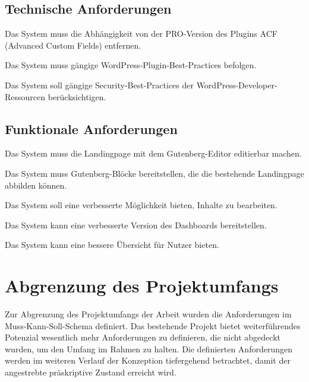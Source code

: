\subsection{Technische Anforderungen}
\begin{enumerate}[label={[T\arabic*]},ref=T\arabic*]
    \item \label{T1} Das System muss die Abhängigkeit von der PRO-Version des Plugins ACF (Advanced Custom Fields) entfernen.
    \item \label{T2} Das System muss gängige WordPress-Plugin-Best-Practices befolgen.
    \item \label{T3} Das System soll gängige Security-Best-Practices der WordPress-Developer-Ressourcen berücksichtigen.
\end{enumerate}

\subsection{Funktionale Anforderungen}
\begin{enumerate}[label={[F\arabic*]},ref=F\arabic*]
    \item \label{F1} Das System muss die Landingpage mit dem Gutenberg-Editor editierbar machen.
    \item \label{F2} Das System muss Gutenberg-Blöcke bereitstellen, die die bestehende Landingpage abbilden können.
    \item \label{F3} Das System soll eine verbesserte Möglichkeit bieten, Inhalte zu bearbeiten.
    \item \label{F4} Das System kann eine verbesserte Version des Dashboards bereitstellen.
    \item \label{F5} Das System kann eine bessere Übersicht für Nutzer bieten.
\end{enumerate}

\section{Abgrenzung des Projektumfangs}
Zur Abgrenzung des Projektumfangs der Arbeit wurden die Anforderungen im Muss-Kann-Soll-Schema definiert.
Das bestehende Projekt bietet weiterführendes Potenzial wesentlich mehr Anforderungen zu definieren, die nicht abgedeckt wurden, um den Umfang im Rahmen zu halten.
Die definierten Anforderungen werden im weiteren Verlauf der Konzeption tiefergehend betrachtet, damit der angestrebte präskriptive Zustand erreicht wird.

